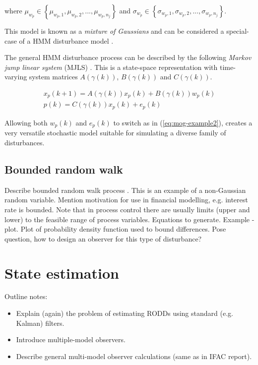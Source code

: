where $\mu_{w_p}\in\left\{\mu_{w_p,1},\mu_{w_p,2},...,\mu_{w_p,n_j}\right\}$ and $\sigma_{w_p}\in\left\{\sigma_{w_p,1},\sigma_{w_p,2},...,\sigma_{w_p,n_j}\right\}$.

This model is known as a \textit{mixture of Gaussians} and can be considered a special-case of a HMM disturbance model \citep{wong_disturbance_2007}.

The general HMM disturbance process can be described by the following \textit{Markov jump linear system} (MJLS) \citep{costa_discrete-time_2005}. This is a state-space representation with time-varying system matrices $A(\gamma(k))$, $B(\gamma(k))$ and $C(\gamma(k))$.

\begin{equation} \label{eq:HMM}
	\begin{split}
	x_p(k+1)= A(\gamma(k))x_p(k)+B(\gamma(k))w_p(k) \\
	p(k)=C(\gamma(k))x_p(k) + e_p(k)
	\end{split}
\end{equation}

Allowing both $w_p(k)$ and $e_p(k)$ to switch as in (\ref{eq:mog-example2}), creates a very versatile stochastic model suitable for simulating a diverse family of disturbances.

\subsection{Bounded random walk}

\begin{outline}
	\1 Describe bounded random walk process \citep{nicolau_bounded_2002}.
	\1 This is an example of a non-Gaussian random variable.
	\1 Mention motivation for use in financial modelling, e.g. interest rate is bounded.
	\1 Note that in process control there are usually limits (upper and lower) to the feasible range of process variables.
	\1 Equations to generate.
	\1 Example - plot.
	\1 Plot of probability density function used to bound differences.
	\1 Pose question, how to design an observer for this type of disturbance? 
\end{outline}

\section{State estimation}

Outline notes:
\begin{itemize}
	\item Explain (again) the problem of estimating RODDs using standard (e.g. Kalman) filters.
	\item Introduce multiple-model observers.
	\item Describe general multi-model observer calculations (same as in IFAC report).
\end{itemize}


